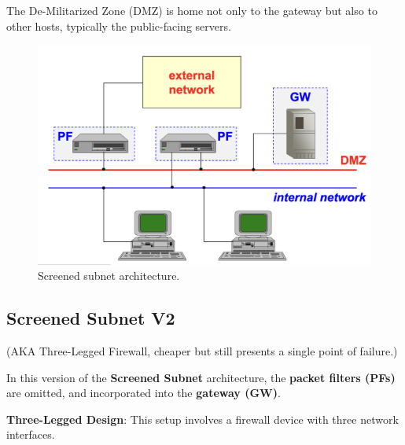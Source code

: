\begin{tcolorbox}[colback=blue!10!white, colframe=blue!50!white, title=DMZ]
    The De-Militarized Zone (DMZ) is home not only to the gateway but also to other hosts, typically the public-facing servers.
\end{tcolorbox}

\begin{figure}[H]
    \centering
    \includegraphics[width=0.5\linewidth]{Images/Firewalling/screened_subnet.png}
    \caption{Screened subnet architecture.}
\end{figure}

\subsection{Screened Subnet V2}
\begin{center}
    (AKA Three-Legged Firewall, cheaper but still presents a single point of failure.)
\end{center}

\noindent In this version of the \textbf{Screened Subnet} architecture, the \textbf{packet filters (PFs)} are omitted, and incorporated into the \textbf{gateway (GW)}. 


\noindent\textbf{Three-Legged Design}: This setup involves a firewall device with three network interfaces.

